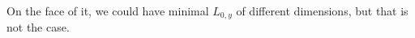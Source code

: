 On the face of it, we could have minimal $L_{0, y}$ of different dimensions,
but that is not the case.
